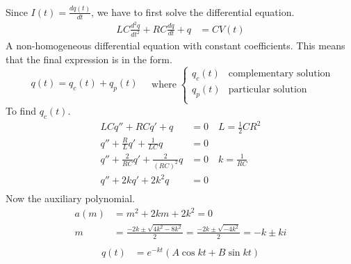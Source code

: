 \documentclass[]{article}
\begin{document}
{\begin{enumerate}
\begin{enumerate}
\begin{equation*}
\begin{split}
								\end{split}
							\end{equation*}
							Since $I(t) = \frac{dq(t)}{dt}$, we have to first solve the differential equation.
							\begin{equation*}
								\begin{split}
									LC \frac{d^2 q}{dt^2} + RC\frac{dq}{dt} + q &= CV(t)
								\end{split}
							\end{equation*}
							A non-homogeneous differential equation with constant coefficients. This means that the final expression is in the form. 
							\begin{equation*}
								\begin{split}
									q(t) = q_c(t) + q_p(t)
								\end{split}
								\quad \text{where} \;
								\begin{cases}
									q_c(t) & \text{complementary solution} \\
									q_p(t) & \text{particular solution} \\
								\end{cases}
							\end{equation*}
							To find $q_c(t)$.
							\begin{equation*}
								\begin{split}
									LC q'' + RCq' + q &= 0 \quad L = \frac{1}{2} CR^2 \\
									q'' + \frac{R}{L}q' + \frac{1}{LC} q &= 0 \\ 
									q'' + \frac{2}{RC}q' + \frac{2}{(RC)^2} q &= 0 \quad k = \frac{1}{RC} \\
									q'' + 2k q' + 2k^2 q &= 0 \\
								\end{split}
							\end{equation*}
							Now the auxiliary polynomial.
							\begin{equation*}
								\begin{split}
									a(m) &= m^2 + 2km + 2k^2 = 0 \\
									m &= \frac{ -2k \pm \sqrt{ 4k^2 - 8k^2 } }{2}
									= \frac{ -2k \pm \sqrt{ -4k^2 } }{2}
									= -k \pm ki \\
								\end{split}
							\end{equation*}
							\begin{equation*}
								\begin{split}
									q(t) &= e^{-kt} ( A \cos kt + B \sin kt ) \\

\end{split}
\end{equation*}
\end{enumerate}
\end{enumerate}}
\end{document}
